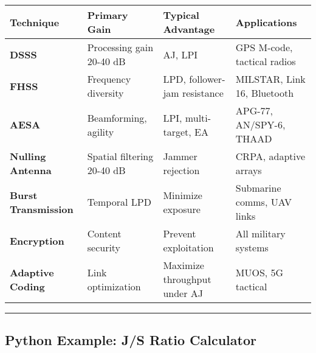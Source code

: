 {\def\LTcaptype{} %
\begin{longtable}[]{@{}
  >{\raggedright\arraybackslash}p{}
  >{\raggedright\arraybackslash}p{}
  >{\raggedright\arraybackslash}p{}
  >{\raggedright\arraybackslash}p{}@{}}
\toprule\noalign{}
\begin{minipage}[b]{\linewidth}\raggedright
Technique
\end{minipage} & \begin{minipage}[b]{\linewidth}\raggedright
Primary Gain
\end{minipage} & \begin{minipage}[b]{\linewidth}\raggedright
Typical Advantage
\end{minipage} & \begin{minipage}[b]{\linewidth}\raggedright
Applications
\end{minipage} \\
\midrule\noalign{}
\endhead
\bottomrule\noalign{}
\endlastfoot
\textbf{DSSS} & Processing gain 20-40 dB & AJ, LPI & GPS M-code,
tactical radios \\
\textbf{FHSS} & Frequency diversity & LPD, follower-jam resistance &
MILSTAR, Link 16, Bluetooth \\
\textbf{AESA} & Beamforming, agility & LPI, multi-target, EA & APG-77,
AN/SPY-6, THAAD \\
\textbf{Nulling Antenna} & Spatial filtering 20-40 dB & Jammer rejection
& CRPA, adaptive arrays \\
\textbf{Burst Transmission} & Temporal LPD & Minimize exposure &
Submarine comms, UAV links \\
\textbf{Encryption} & Content security & Prevent exploitation & All
military systems \\
\textbf{Adaptive Coding} & Link optimization & Maximize throughput under
AJ & MUOS, 5G tactical \\
\end{longtable}
}

\begin{center}\rule{0.5\linewidth}{0.5pt}\end{center}

\subsection{\texorpdfstring{ Python Example: J/S Ratio
Calculator}{ Python Example: J/S Ratio Calculator}}\label{python-example-js-ratio-calculator}


